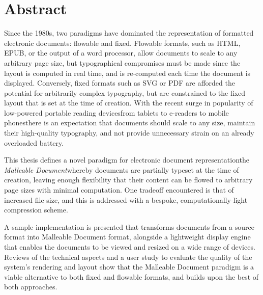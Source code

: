 \cleardoublepage
\begingroup
\let\clearpage\relax
\let\cleardoublepage\relax
\let\cleardoublepage\relax

\chapter*{Abstract}

Since the 1980s, two paradigms have dominated the representation of formatted electronic documents: flowable and fixed. Flowable formats, such as HTML, EPUB, or the output of a word processor, allow documents to scale to any arbitrary page size, but typographical compromises must be made since the layout is computed in real time, and is re-computed each time the document is displayed. Conversely, fixed formats such as SVG or PDF are afforded the potential for arbitrarily complex typography, but are constrained to the fixed layout that is set at the time of creation. With the recent surge in popularity of low-powered portable reading devices\ed{}from tablets to e-readers to mobile phones\ed{}there is an expectation that documents should scale to any size, maintain their high-quality typography, and not provide unnecessary strain on an already overloaded battery.

This thesis defines a novel paradigm for electronic document representation\ed{}the \emph{Malleable Document}\ed{}whereby documents are partially typeset at the time of creation, leaving enough flexibility that their content can be flowed to arbitrary page sizes with minimal computation. One tradeoff encountered is that of increased file size, and this is addressed with a bespoke, computationally-light compression scheme.

A sample implementation is presented that transforms documents from a source format into Malleable Document format, alongside a lightweight display engine that enables the documents to be viewed and resized on a wide range of devices. Reviews of the technical aspects and a user study to evaluate the quality of the system's rendering and layout show that the Malleable Document paradigm is a viable alternative to both fixed and flowable formats, and builds upon the best of both approaches.


\endgroup

\vfill